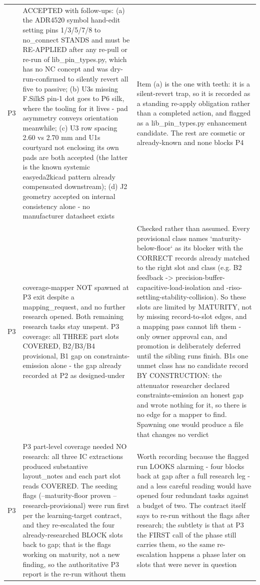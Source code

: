 \documentclass[11pt,a4paper]{article}
\begin{document}
{\begin{longtable}{lp{5.2cm}p{7.2cm}}
P3 & ACCEPTED with follow-ups: (a) the ADR4520 symbol hand-edit setting pins 1/3/5/7/8 to no\_connect STANDS and must be RE-APPLIED after any re-pull or re-run of lib\_pin\_types.py, which has no NC concept and was dry-run-confirmed to silently revert all five to passive; (b) U3s missing F.SilkS pin-1 dot goes to P6 silk, where the tooling for it lives - pad asymmetry conveys orientation meanwhile; (c) U3 row spacing 2.60 vs 2.70 mm and U1s courtyard not enclosing its own pads are both accepted (the latter is the known systemic easyeda2kicad pattern already compensated downstream); (d) J2 geometry accepted on internal consistency alone - no manufacturer datasheet exists & Item (a) is the one with teeth: it is a silent-revert trap, so it is recorded as a standing re-apply obligation rather than a completed action, and flagged as a lib\_pin\_types.py enhancement candidate. The rest are cosmetic or already-known and none blocks P4 \\
P3 & coverage-mapper NOT spawned at P3 exit despite a mapping\_request, and no further research opened. Both remaining research tasks stay unspent. P3 coverage: all THREE part slots COVERED, B2/B3/B4 provisional, B1 gap on constraints-emission alone - the gap already recorded at P2 as designed-under & Checked rather than assumed. Every provisional class names `maturity-below-floor` as its blocker with the CORRECT records already matched to the right slot and class (e.g. B2 feedback -\textgreater{} precision-buffer-capacitive-load-isolation and -riso-settling-stability-collision). So these slots are limited by MATURITY, not by missing record-to-slot edges, and a mapping pass cannot lift them - only owner approval can, and promotion is deliberately deferred until the sibling runs finish. B1s one unmet class has no candidate record BY CONSTRUCTION: the attenuator researcher declared constraints-emission an honest gap and wrote nothing for it, so there is no edge for a mapper to find. Spawning one would produce a file that changes no verdict \\
P3 & P3 part-level coverage needed NO research: all three IC extractions produced substantive layout\_notes and each part slot reads COVERED. The seeding flags (--maturity-floor proven --research-provisional) were run first per the learning-target contract, and they re-escalated the four already-researched BLOCK slots back to gap; that is the flags working on maturity, not a new finding, so the authoritative P3 report is the re-run without them & Worth recording because the flagged run LOOKS alarming - four blocks back at gap after a full research leg - and a less careful reading would have opened four redundant tasks against a budget of two. The contract itself says to re-run without the flags after research; the subtlety is that at P3 the FIRST call of the phase still carries them, so the same re-escalation happens a phase later on slots that were never in question \\

\end{longtable}}
\end{document}
